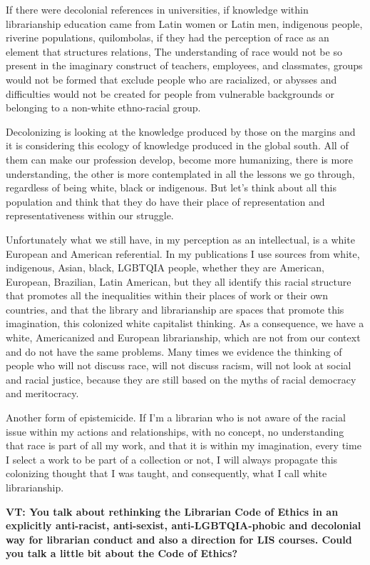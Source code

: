 \documentclass[a4paper,
fontsize=11pt,
oneside,
numbers=noperiodatend,
parskip=half-,
bibliography=totoc,
final
]{scrartcl}
\begin{document}
If there were decolonial references in universities, if knowledge within
librarianship education came from Latin women or Latin men, indigenous
people, riverine populations, quilombolas, if they had the perception of
race as an element that structures relations, The understanding of race
would not be so present in the imaginary construct of teachers,
employees, and classmates, groups would not be formed that exclude
people who are racialized, or abysses and difficulties would not be
created for people from vulnerable backgrounds or belonging to a
non-white ethno-racial group.

Decolonizing is looking at the knowledge produced by those on the
margins and it is considering this ecology of knowledge produced in the
global south. All of them can make our profession develop, become more
humanizing, there is more understanding, the other is more contemplated
in all the lessons we go through, regardless of being white, black or
indigenous. But let's think about all this population and think that
they do have their place of representation and representativeness within
our struggle.

Unfortunately what we still have, in my perception as an intellectual,
is a white European and American referential. In my publications I use
sources from white, indigenous, Asian, black, LGBTQIA people, whether
they are American, European, Brazilian, Latin American, but they all
identify this racial structure that promotes all the inequalities within
their places of work or their own countries, and that the library and
librarianship are spaces that promote this imagination, this colonized
white capitalist thinking. As a consequence, we have a white,
Americanized and European librarianship, which are not from our context
and do not have the same problems. Many times we evidence the thinking
of people who will not discuss race, will not discuss racism, will not
look at social and racial justice, because they are still based on the
myths of racial democracy and meritocracy.

Another form of epistemicide. If I'm a librarian who is not aware of the
racial issue within my actions and relationships, with no concept, no
understanding that race is part of all my work, and that it is within my
imagination, every time I select a work to be part of a collection or
not, I will always propagate this colonizing thought that I was taught,
and consequently, what I call white librarianship.

\textbf{VT: You talk about rethinking the Librarian Code of Ethics in an
explicitly anti-racist, anti-sexist, anti-LGBTQIA-phobic and decolonial
way for librarian conduct and also a direction for LIS courses. Could
you talk a little bit about the Code of Ethics?}
\end{document}
